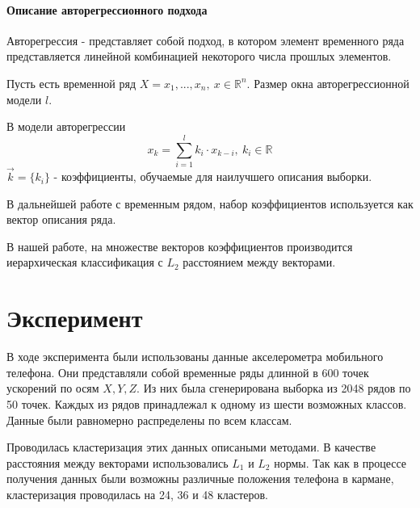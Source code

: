 \documentclass[12pt,twoside]{article}
\begin{document}
        \paragraph{Описание авторегрессионного подхода}
            Авторегрессия - представляет собой подход, в котором элемент временного ряда представляется линейной комбинацией некоторого числа прошлых элементов.

            Пусть есть временной ряд $X = x_1, ... , x_n, \ x \in \mathbb{R}^n$.
            Размер окна авторегрессионной модели $l$.

            В модели авторегрессии $$ x_k = \sum\limits_{i=1}^{l} k_i \cdot x_{k-i}, \ k_i \in \mathbb{R} $$
            $\vec{k} = \{k_i\}$ \-- коэффициенты, обучаемые для наилучшего описания выборки.

            В дальнейшей работе с временным рядом, набор коэффициентов используется как вектор описания ряда.

            В нашей работе, на множестве векторов коэффициентов производится иерархическая классификация с $L_2$ расстоянием между векторами.

        
    \section{Эксперимент}
        
        В ходе эксперимента были использованы данные акселерометра мобильного телефона.
        Они представляли собой временные ряды длинной в 600 точек ускорений по осям $X, Y, Z$.
        Из них была сгенерирована выборка из 2048 рядов по 50 точек.
        Каждых из рядов принадлежал к одному из шести возможных классов. Данные были равномерно распределены по всем классам.

        Проводилась кластеризация этих данных описаными методами. В качестве расстояния между векторами использовались $L_1$  и $L_2$ нормы.
        Так как в процессе получения данных были возможны различные положения телефона в кармане, кластеризация проводилась на 24, 36 и 48 кластеров.
\end{document}
